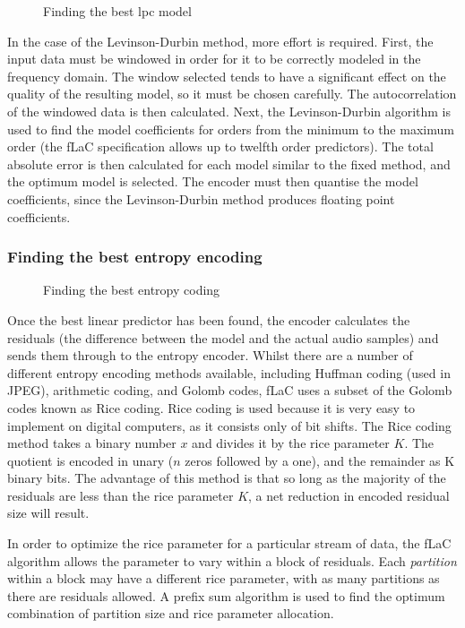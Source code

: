 \documentclass[12pt]{scrartcl}
\begin{document}
  
  \begin{figure}[H]
    \caption{Finding the best lpc model}
    \label{fig:lpc_optimisation}
  \end{figure}
  In the case of the Levinson-Durbin method, more effort is required. First, the input data must be windowed in order for it to be correctly modeled in the frequency domain\cite{hamming_reason}. The window selected tends to have a significant effect on the quality of the resulting model, so it must be chosen carefully. The autocorrelation of the windowed data is then calculated. Next, the Levinson-Durbin algorithm is used to find the model coefficients for orders from the minimum to the maximum order (the fLaC specification allows up to twelfth order predictors\cite{flac_format}). The total absolute error is then calculated for each model similar to the fixed method, and the optimum model is selected. The encoder must then quantise the model coefficients, since the Levinson-Durbin method produces floating point coefficients.
  
  \subsubsection*{Finding the best entropy encoding}
  \begin{figure}[H]
    \caption{Finding the best entropy coding}
    \label{fig:entropy_optimisation}
  \end{figure}
  Once the best linear predictor has been found, the encoder calculates the residuals (the difference between the model and the actual audio samples) and sends them through to the entropy encoder. Whilst there are a number of different entropy encoding methods available, including Huffman coding (used in JPEG\cite{huffman_jpeg}), arithmetic coding, and Golomb codes, fLaC uses a subset of the Golomb codes known as Rice coding. Rice coding is used because it is very easy to implement on digital computers, as it consists only of bit shifts. The Rice coding method takes a binary number \(x\) and divides it by the rice parameter \(K\). The quotient is encoded in unary (\(n\) zeros followed by a one), and the remainder as K binary bits. The advantage of this method is that so long as the majority of the residuals are less than the rice parameter \(K\), a net reduction in encoded residual size will result. 
  
  In order to optimize the rice parameter for a particular stream of data, the fLaC algorithm allows the parameter to vary within a block of residuals. Each \textit{partition} within a block may have a different rice parameter, with as many partitions as there are residuals allowed.  A prefix sum algorithm is used to find the optimum combination of partition size and rice parameter allocation.
  
\end{document}

